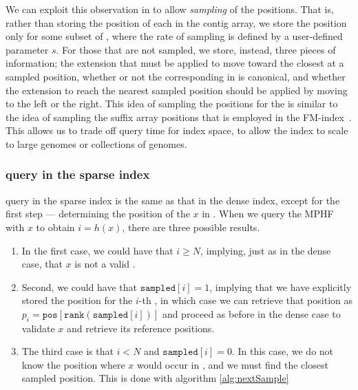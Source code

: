 We can exploit this observation in \pufferfish to allow \emph{sampling} of the \kmer
positions. That is, rather than storing the position of each \kmer in the contig
array, we store the position only for some subset of \kmers, where the rate of
sampling is defined by a user-defined parameter $s$. For those \kmers that are
not sampled, we store, instead, three pieces of information; the extension that
must be applied to move toward the closest \kmer at a sampled position, whether
or not the corresponding \kmer in \cseq is canonical, and whether the extension
to reach the nearest sampled position should be applied by moving to the left or
the right. 
This idea of sampling the positions for the \kmers is similar to the
idea of sampling the suffix array positions that is employed in the
FM-index~\cite{Ferragina2001Experimental}. This allows us to trade off query
time for index space, to allow the \pufferfish index to scale to large genomes or
collections of genomes. 


\subsubsection*{\kmer query in the sparse \pufferfish index}  \kmer query in the sparse \pufferfish index
is the same as that in the dense index, except for the first step ---
determining the position of the \kmer $x$ in \cseq. When we query the MPHF with
$x$ to obtain $i = h(x)$, there are three possible results. 
\begin{enumerate}
\item In the first case,
we could have that $i \geq N$, implying, just as in the dense case, that $x$ is
not a valid \kmer. 
\item Second, we could have that $\texttt{sampled}[i] = 1$,
implying that we have explicitly stored the position for the $i$-th \kmer, in
which case we can retrieve that position as $p_{i} = \texttt{pos}[\texttt{rank}(\texttt{sampled}[i])]$ and
proceed as before in the dense case to validate $x$ and retrieve its reference positions.
\item The third case is that $i < N$ and $\texttt{sampled}[i] = 0$. In this case, we do not know
the position where $x$ would occur in \cseq, and we must find the closest sampled position.
This is done with algorithm \ref{alg:nextSample}
\end{enumerate}

